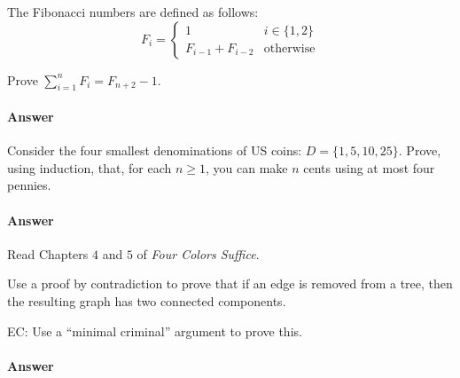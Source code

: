 \documentclass{article}
\begin{document}
The Fibonacci numbers are defined as follows:
$$
    F_i = \begin{cases}
            1 & i \in \{1,2\} \\
            F_{i-1}+F_{i-2} & \text{otherwise}
          \end{cases}
$$

Prove $\sum_{i=1}^n F_i = F_{n+2}-1$.

\paragraph{Answer}


\collab{\todo{}} 

Consider the four smallest denominations of US coins: $D=\{1,5,10,25\}$.  Prove, using
induction, that, for each $n \geq 1$, you can make $n$ cents using at most four
pennies.

\paragraph{Answer}


\collab{\todo{}} 

Read Chapters $4$ and $5$ of \emph{Four Colors Suffice}.

Use a proof by contradiction to prove that if an edge is removed from a
tree, then the resulting graph has two connected components.

EC:
Use a ``minimal criminal'' argument to prove this.

        \paragraph{Answer}


% 
% 
\end{document}
